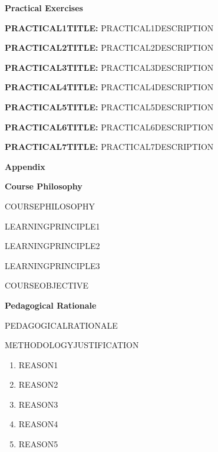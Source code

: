 \documentclass{article}
\begin{document}
\pagebreak

{\huge \textbf{Practical Exercises}}

\textbf{PRACTICAL1TITLE:} PRACTICAL1DESCRIPTION
 	
\textbf{PRACTICAL2TITLE:} PRACTICAL2DESCRIPTION
 	
\textbf{PRACTICAL3TITLE:} PRACTICAL3DESCRIPTION
 	
\textbf{PRACTICAL4TITLE:} PRACTICAL4DESCRIPTION
 	
\textbf{PRACTICAL5TITLE:} PRACTICAL5DESCRIPTION
 	
\textbf{PRACTICAL6TITLE:} PRACTICAL6DESCRIPTION
 	
\textbf{PRACTICAL7TITLE:} PRACTICAL7DESCRIPTION



\vspace{1cm}

\pagebreak

{\huge \textbf{Appendix}}

\pagebreak
{\huge \textbf{Course Philosophy}}
\vspace{1cm}

COURSEPHILOSOPHY

LEARNINGPRINCIPLE1

LEARNINGPRINCIPLE2

LEARNINGPRINCIPLE3

COURSEOBJECTIVE

\pagebreak

{\huge \textbf{Pedagogical Rationale}}
\vspace{1cm}

PEDAGOGICALRATIONALE

METHODOLOGYJUSTIFICATION

\begin{enumerate}
	\item REASON1
	
	\item REASON2
	
	\item REASON3
	
	\item REASON4
	
	\item REASON5
	
\end{enumerate}

\pagebreak

\vspace{1cm}
\end{document}
